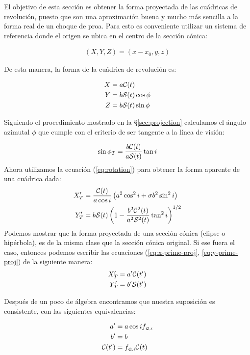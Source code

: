 El objetivo de esta sección es obtener la forma proyectada de las cuádricas de revolución, puesto que son una aproximación buena y mucho más sencilla a la forma real de un choque de proa. Para esto es conveniente utilizar un sistema de referencia donde el origen se ubica en el centro de la sección cónica:

\begin{align}
  (X, Y, Z) = (x-x_0, y, z)
\end{align}

De esta manera, la forma de la cuádrica de revolución es:

\begin{align}
  X &= a\mathcal{C}(t) \\
  Y &= b\mathcal{S}(t)\cos\phi \\
  Z &= b\mathcal{S}(t)\sin\phi
\end{align}

Siguiendo el procedimiento mostrado en la \S \ref{sec:projection} calculamos el ángulo azimutal $\phi$ que cumple con el criterio de ser tangente a la línea de visión: 

\begin{align}
  \sin\phi_T = \frac{b\mathcal{C}(t)}{a\mathcal{S}(t)}\tan i 
\end{align}
Ahora utilizamos la ecuación (\ref{eq:rotation}) para obtener la forma aparente de una cuádrica dada:
\begin{align}
  X'_T &= \frac{\mathcal{C}(t)}{a\cos i}\left(a^2\cos^2 i + \sigma b^2\sin^2 i\right)
  \label{eq:x-prime-proj}\\
  Y'_T &= b\mathcal{S}(t)\left(1 - \frac{b^2\mathcal{C}^2(t)}{a^2\mathcal{S}^2(t)}\tan^2 i\right)^{1/2}
  \label{eq:y-prime-proj}
\end{align}
Podemos mostrar que la forma proyectada de una sección cónica (elipse o hipérbola), es de la misma clase que la sección cónica original. Si ese fuera el caso, entonces podemos escribir las ecuaciones (\ref{eq:x-prime-proj}, \ref{eq:y-prime-proj}) de la siguiente manera:
\begin{align}
  X'_T &= a'\mathcal{C}(t') \label{eq:xtprime}\\
  Y'_T &= b'\mathcal{S}(t') \label{eq:ytprime}
\end{align}

Después de un poco de álgebra encontramos que nuestra suposición es consistente, con las siguientes equivalencias:

\begin{align}
  a' &= a\cos i f_{\scriptscriptstyle \mathcal{Q}, i} \label{eq:a-prime}\\
  b' &= b \label{eq:b-prime}\\
  \mathcal{C}(t') &= f_{\scriptscriptstyle \mathcal{Q}, i} \mathcal{C}(t)
\end{align}

